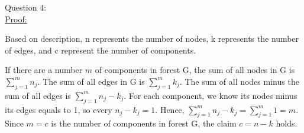 \documentclass[12pt]{article}
\begin{document}
\pagebreak
\large Question 4: \vspace{5mm}\\
\normalsize 
\setlength{\baselineskip}{8mm}
\underline{Proof:} \par
Based on description, n represents the number of nodes, k represents the number of edges, and c represent the number of components. \par 
If there are a number $m$ of components in forest G, the sum of all nodes in G is $\sum_{j=1}^{m} {n_j} $. 
The sum of all edges in G is $\sum_{j=1}^{m} {k_j} $. The sum of all nodes minus the sum of all edges is $\sum_{j=1}^{m} { n_j - k_j} $. 
For each component, we know its nodes minus its edges equals to 1, so every $n_j - k_j = 1$. 
Hence, $\sum_{j=1}^{m} { n_j - k_j} = \sum_{j=1}^{m} 1 = m$. Since $m = c$ is the number of components in forest G, the claim $c = n - k$ holds. 
\end{document}
